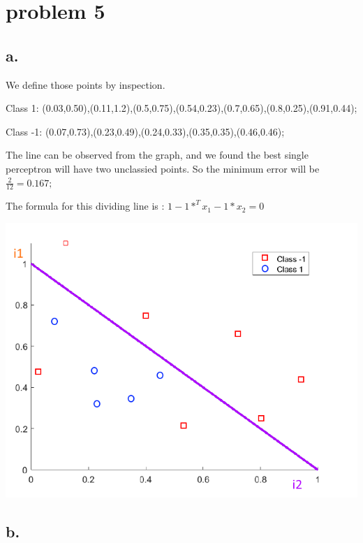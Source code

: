 \documentclass[12pt, letterpaper]{article}
\begin{document}
	\pagebreak
	\section{problem 5}
	\subsection{a.}
	
	We define those points by inspection.
	
	Class 1: (0.03,0.50),(0.11,1.2),(0.5,0.75),(0.54,0.23),(0.7,0.65),(0.8,0.25),(0.91,0.44);
	
	Class -1: (0.07,0.73),(0.23,0.49),(0.24,0.33),(0.35,0.35),(0.46,0.46);
	
	The line can be observed from the graph, and we found the best single perceptron will have two unclassied points. So the minimum error will be
	$\frac{2}{12}= 0.167; $
	
	The formula for this dividing line is : $1-1*^{T}x_{1}-1*x_{2}=0$
	
	\includegraphics[scale=0.6]{"problem-5a"}
	
	\subsection{b.}
	
\end{document}
